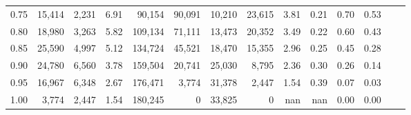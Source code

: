 \begin{tabular}{rrrrrrrrrrrrrr}
0.75 &  15,414 &  2,231 &    6.91 &   90,154 &   90,091 &  10,210 &  23,615 &  3.81 &  0.21 &  0.70 &      0.53 \\
0.80 &  18,980 &  3,263 &    5.82 &  109,134 &   71,111 &  13,473 &  20,352 &  3.49 &  0.22 &  0.60 &      0.43 \\
0.85 &  25,590 &  4,997 &    5.12 &  134,724 &   45,521 &  18,470 &  15,355 &  2.96 &  0.25 &  0.45 &      0.28 \\
0.90 &  24,780 &  6,560 &    3.78 &  159,504 &   20,741 &  25,030 &   8,795 &  2.36 &  0.30 &  0.26 &      0.14 \\
0.95 &  16,967 &  6,348 &    2.67 &  176,471 &    3,774 &  31,378 &   2,447 &  1.54 &  0.39 &  0.07 &      0.03 \\
1.00 &   3,774 &  2,447 &    1.54 &  180,245 &        0 &  33,825 &       0 &   nan &   nan &  0.00 &      0.00 \\
\bottomrule
\end{tabular}
